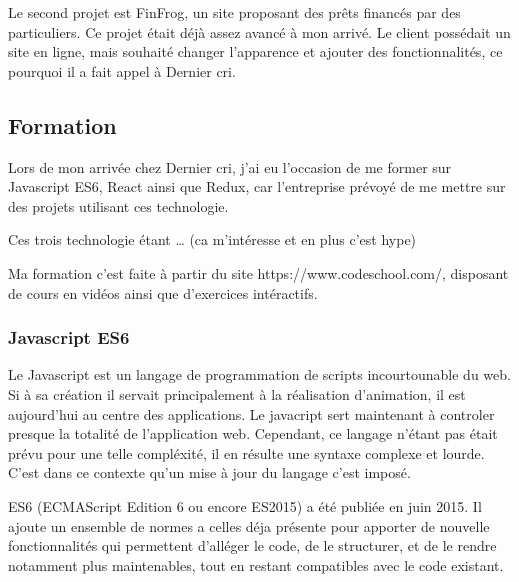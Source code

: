 \documentclass[12pt,a4paper]{article}
\begin{document}
  \bigskip

  Le second projet est FinFrog, un site proposant des prêts financés par
  des particuliers. Ce projet était déjà assez avancé à mon arrivé. Le
  client possédait un site en ligne, mais souhaité changer l'apparence et
  ajouter des fonctionnalités, ce pourquoi il a fait appel à Dernier cri.

  \subsection{Formation}\label{formation}

  \bigskip

  Lors de mon arrivée chez Dernier cri, j'ai eu l'occasion de me former
  sur Javascript ES6, React ainsi que Redux, car l'entreprise prévoyé de
  me mettre sur des projets utilisant ces technologie.

  \bigskip

  Ces trois technologie étant \ldots{} (ca m'intéresse et en plus c'est
  hype)

  \bigskip

  Ma formation c'est faite à partir du site https://www.codeschool.com/,
  disposant de cours en vidéos ainsi que d'exercices intéractifs.

  \bigskip

  \subsubsection{Javascript ES6}\label{javascript-es6}

  \bigskip

  Le Javascript est un langage de programmation de scripts incourtounable
  du web. Si à sa création il servait principalement à la réalisation
  d'animation, il est aujourd'hui au centre des applications. Le javacript
  sert maintenant à controler presque la totalité de l'application web.
  Cependant, ce langage n'étant pas était prévu pour une telle compléxité,
  il en résulte une syntaxe complexe et lourde. C'est dans ce contexte
  qu'un mise à jour du langage c'est imposé.

  \bigskip

  ES6 (ECMAScript Edition 6 ou encore ES2015) a été publiée en juin 2015.
  Il ajoute un ensemble de normes a celles déja présente pour apporter de
  nouvelle fonctionnalités qui permettent d'alléger le code, de le
  structurer, et de le rendre notamment plus maintenables, tout en restant
  compatibles avec le code existant.
\end{document}
